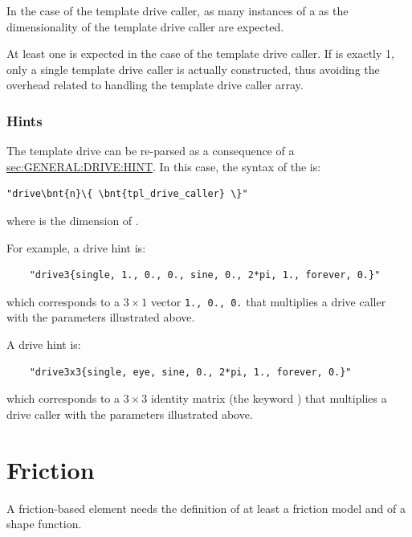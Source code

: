 In the case of the  template drive caller,
as many instances of a  as the dimensionality
of the template drive caller are expected.

At least one  is expected in the case of the 
template drive caller. 
If  is exactly 1, only a single
template drive caller is actually constructed, thus avoiding the overhead 
related to handling the template drive caller array.    

\subsubsection{Hints}
The template drive can be re-parsed as a consequence of a
\hyperref{\kw{hint}}{\kw{hint} (see Section~}{)}{sec:GENERAL:DRIVE:HINT}.
In this case, the syntax of the  is:
\begin{Verbatim}[commandchars=\\\{\}]
    "drive\bnt{n}\{ \bnt{tpl_drive_caller} \}"
\end{Verbatim}
where  is the dimension of .

For example, a  drive hint is:
\begin{verbatim}
    "drive3{single, 1., 0., 0., sine, 0., 2*pi, 1., forever, 0.}"
\end{verbatim}
which corresponds to a $3 \times 1$ vector \texttt{1., 0., 0.} that multiplies
a  drive caller with the parameters illustrated above.

A  drive hint is:
\begin{verbatim}
    "drive3x3{single, eye, sine, 0., 2*pi, 1., forever, 0.}"
\end{verbatim}
which corresponds to a $3 \times 3$ identity matrix (the keyword ) that multiplies
a  drive caller with the parameters illustrated above.







\section{Friction}
A friction-based element needs the definition of
at least a friction model and of a shape function.

